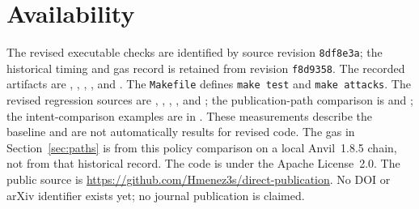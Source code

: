 \documentclass[11pt]{article}
\begin{document}
\section*{Availability}
The revised executable checks are identified by source revision \texttt{8df8e3a}; the historical timing and gas record is retained from revision \texttt{f8d9358}. The recorded artifacts are , , , , and . The \texttt{Makefile} defines \texttt{make test} and \texttt{make attacks}. The revised regression sources are , , , , and ; the publication-path comparison is  and ; the intent-comparison examples are in . These measurements describe the baseline and are not automatically results for revised code. The gas in Section~\ref{sec:paths} is from this policy comparison on a local Anvil~1.8.5 chain, not from that historical record. The code is under the Apache License~2.0. The public source is \url{https://github.com/Hmenez3s/direct-publication}. No DOI or arXiv identifier exists yet; no journal publication is claimed.



\end{document}
